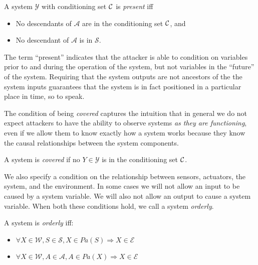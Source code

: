 \documentclass[../thesis.tex]{subfiles}
\begin{document}
\begin{dfn}[Present]
  A system $\mathcal{Y}$ with conditioning set $\mathcal{C}$ is \emph{present}
   iff
  \begin{itemize}
  \item No descendants of $\mathcal{A}$ are in the
    conditioning set $\mathcal{C}$, and
  \item No descendant of $\mathcal{A}$ is in
    $\mathcal{S}$.
  \end{itemize}
\end{dfn}

The term ``present'' indicates that the attacker
is able to condition on variables prior to and
during the operation of the system, but not
variables in the ``future'' of the system.
Requiring that the system outputs are not ancestors of
the the system inputs guarantees that the system is
in fact positioned in a particular place in time,
so to speak.

The condition of being \emph{covered} captures the intuition
that in general we do not expect attackers to have
the ability to observe systems 
\emph{as they are functioning}, even if we allow them
to know exactly how a system works because
they know the causal relationships between the
system components.

\begin{dfn}[Covered]
  \label{def:covered-system}
  A system is \emph{covered} if no $Y \in \mathcal{Y}$
  is in the conditioning set $\mathcal{C}$.
\end{dfn}

%
%

We also specify a condition on the relationship
between sensors, actuators, the system, and the environment.
In some cases we will not allow an input to be caused
by a system variable.
We will also not allow an output to cause a system variable.
When both these conditions hold, we call a system \emph{orderly}.

\begin{dfn}[Orderly]
  \label{def:orderly-system}
  A system is \emph{orderly} iff:
  \begin{itemize}
  \item $\forall X \in \mathcal{W}, S \in \mathcal{S}, X \in Pa(S) \Longrightarrow X \in \mathcal{E}$
  \item $\forall X \in \mathcal{W}, A \in \mathcal{A}, A \in Pa(X) \Longrightarrow X \in \mathcal{E}$
  \end{itemize}
\end{dfn}
\end{document}
